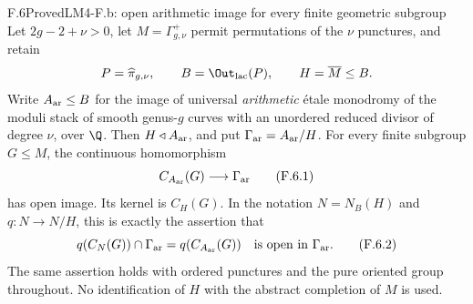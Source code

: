 \begin{claim}{F.6}{Proved}{LM4-F.b: open arithmetic image for every finite geometric subgroup}
Let $2g-2+\nu>0$, let $M=\Gamma^+_{g,\nu}$ permit permutations
of the $\nu$ punctures, and retain
\[
 P=\widehat\pi_{g,\nu},\qquad
 B=\Out_{\rm lac}(P),\qquad H=\overline M\leq B.
\]
Write $A_{\rm ar}\leq B$ for the image of universal \emph{arithmetic}
\'etale monodromy of the moduli stack of smooth genus-$g$ curves
with an unordered reduced divisor of degree $\nu$, over $\Q$.
Then $H\triangleleft A_{\rm ar}$, and put
$\Gamma_{\rm ar}=A_{\rm ar}/H$.
For every finite subgroup $G\leq M$, the continuous homomorphism
\[
 C_{A_{\rm ar}}(G)\longrightarrow\Gamma_{\rm ar}
                                                        \tag{F.6.1}
\]
has open image.  Its kernel is $C_H(G)$.
In the notation $N=N_B(H)$ and $q:N\to N/H$, this is exactly
the assertion that
\[
 q(C_N(G))\cap\Gamma_{\rm ar}
       =q(C_{A_{\rm ar}}(G))
       \quad\hbox{is open in }\Gamma_{\rm ar}.           \tag{F.6.2}
\]
The same assertion holds with ordered punctures and the pure
oriented group throughout.  No identification of $H$ with the
abstract completion of $M$ is used.
\end{claim}
